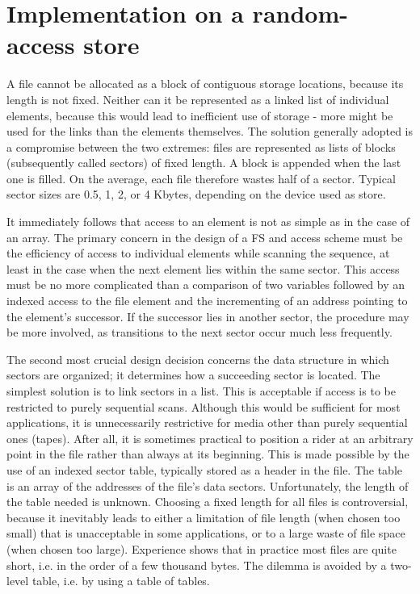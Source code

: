 \section{Implementation on a random-access store}
\label{sec:randstore}
A file cannot be allocated as a block of contiguous storage locations, because its length is not
fixed. Neither can it be represented as a linked list of individual elements, because this would
lead to inefficient use of storage - more might be used for the links than the elements themselves.
The solution generally adopted is a compromise between the two extremes: files are represented
as lists of blocks (subsequently called sectors) of fixed length. A block is appended when the last
one is filled. On the average, each file therefore wastes half of a sector. Typical sector sizes are
0.5, 1, 2, or 4 Kbytes, depending on the device used as store.

It immediately follows that access to an element is not as simple as in the case of an array. The
primary concern in the design of a FS and access scheme must be the efficiency of
access to individual elements while scanning the sequence, at least in the case when the next
element lies within the same sector. This access must be no more complicated than a
comparison of two variables followed by an indexed access to the file element and the
incrementing of an address pointing to the element's successor. If the successor lies in another
sector, the procedure may be more involved, as transitions to the next sector occur much less
frequently.

The second most crucial design decision concerns the data structure in which sectors are
organized; it determines how a succeeding sector is located. The simplest solution is to link
sectors in a list. This is acceptable if access is to be restricted to purely sequential scans.
Although this would be sufficient for most applications, it is unnecessarily restrictive for media
other than purely sequential ones (tapes). After all, it is sometimes practical to position a rider at
an arbitrary point in the file rather than always at its beginning. This is made possible by the use
of an indexed sector table, typically stored as a header in the file. The table is an array of the
addresses of the file's data sectors. Unfortunately, the length of the table needed is unknown.
Choosing a fixed length for all files is controversial, because it inevitably leads to either a
limitation of file length (when chosen too small) that is unacceptable in some applications, or to a
large waste of file space (when chosen too large). Experience shows that in practice most files
are quite short, i.e. in the order of a few thousand bytes. The dilemma is avoided by a two-level
table, i.e. by using a table of tables.

